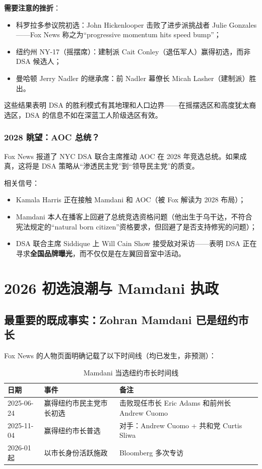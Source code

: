 \documentclass[12pt,a4paper]{ctexart}
\begin{document}
\textbf{需要注意的挫折}：

\begin{itemize}
  \item 科罗拉多参议院初选：John Hickenlooper 击败了进步派挑战者 Julie Gonzales——Fox News 称之为``progressive momentum hits speed bump''；
  \item 纽约州 NY-17（摇摆席）：建制派 Cait Conley（退伍军人）赢得初选，而非 DSA 候选人；
  \item 曼哈顿 Jerry Nadler 的继承席：前 Nadler 幕僚长 Micah Lasher（建制派）胜出。
\end{itemize}

这些结果表明 DSA 的胜利模式有其地理和人口边界——在摇摆选区和高度犹太裔选区，DSA 的信息不如在深蓝工人阶级选区有效。

\subsubsection{2028 眺望：AOC 总统？}

Fox News 报道了 NYC DSA 联合主席推动 AOC 在 2028 年竞选总统。如果成真，这将是 DSA 策略从``渗透民主党''到``领导民主党''的质变。

相关信号：

\begin{itemize}
  \item Kamala Harris 正在接触 Mamdani 和 AOC（被 Fox 解读为 2028 布局）；
  \item Mamdani 本人在播客上回避了总统竞选资格问题（他出生于乌干达，不符合宪法规定的``natural born citizen''资格要求，但回避了是否支持修宪的问题）；
  \item DSA 联合主席 Siddique 上 Will Cain Show 接受敌对采访——表明 DSA 正在寻求\textbf{全国品牌曝光}，而不仅仅是在左翼回音室中活动。
\end{itemize}

\section{2026 初选浪潮与 Mamdani 执政}

\subsection{最重要的既成事实：Zohran Mamdani 已是纽约市长}

Fox News 的人物页面明确记载了以下时间线（均已发生，非预测）：

\begin{table}[h]
\centering
\caption{Mamdani 当选纽约市长时间线}
\begin{tabular}{@{}lp{4.2cm}p{8.2cm}@{}}
\toprule
\textbf{日期} & \textbf{事件} & \textbf{备注} \\
\midrule
2025-06-24 & 赢得纽约市民主党市长初选 & 击败现任市长 Eric Adams 和前州长 Andrew Cuomo \\
2025-11-04 & 赢得纽约市长普选 & 对手：Andrew Cuomo + 共和党 Curtis Sliwa \\
2026-01 起 & 以市长身份活跃施政 & Bloomberg 多次专访 \\
\bottomrule
\end{tabular}
\end{table}
\end{document}
